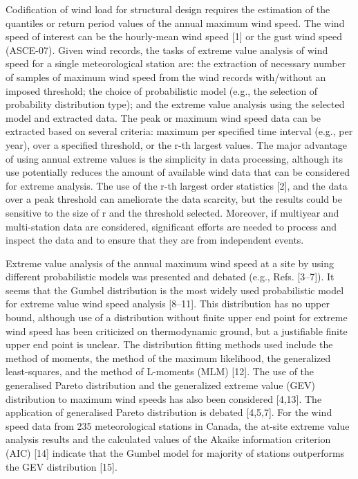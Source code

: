 \begin{framed}
Codification of wind load for structural design requires the estimation of the quantiles or return period values of the annual maximum wind speed. The wind speed of interest can be the hourly-mean wind speed [1] or the gust wind speed (ASCE-07). Given wind records, the tasks of extreme value analysis of wind speed for a single meteorological station are: the extraction of necessary number of samples of maximum wind speed from the wind records with/without an imposed threshold; the choice of probabilistic model (e.g., the selection of probability distribution type); and the extreme value analysis using the selected model and extracted data. The peak or maximum wind speed data can be extracted based on several criteria: maximum per specified time interval (e.g., per year), over a specified threshold, or the r-th largest values. The major advantage of using annual extreme values is the simplicity in data processing, although its use potentially reduces the amount of available wind data that can be considered for extreme analysis. The use of the r-th largest order statistics [2], and the data over a peak threshold can ameliorate the data scarcity, but the results could be sensitive to the size of r and the threshold selected. Moreover, if multiyear and multi-station data are considered, significant efforts are needed to process and inspect the data and to ensure that they are from independent events.

Extreme value analysis of the annual maximum wind speed at a site by using different probabilistic models was presented and debated (e.g., Refs. [3–7]). It seems that the Gumbel distribution is the most widely used probabilistic model for extreme value wind speed analysis [8–11]. This distribution has no upper bound, although use of a distribution without finite upper end point for extreme wind speed has been criticized on thermodynamic ground, but a justifiable finite upper end point is unclear. The distribution fitting methods used include the method of moments, the method of the maximum likelihood, the generalized least-squares, and the method of L-moments (MLM) [12]. The use of the generalised Pareto distribution and the generalized extreme value (GEV) distribution to maximum wind speeds has also been considered [4,13]. The application of generalised Pareto distribution is debated [4,5,7]. For the wind speed data from 235 meteorological stations in Canada, the at-site extreme value analysis results and the calculated values of the Akaike information criterion (AIC) [14] indicate that the Gumbel model for majority of stations outperforms the GEV distribution [15].
\end{framed}




